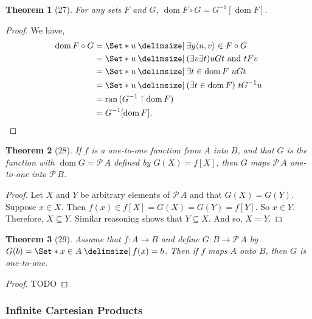 \documentclass[12pt]{article}
\theoremstyle{plain}
\newtheorem*{exthm}{Theorem}
\theoremstyle{remark}
\theoremstyle{definition}
\theoremstyle{remark}
\newcommand{\powerset}{\mathscr{P}\,}
\providecommand\st{}
\newcommand\SetSymbol[1][]{%
  \nonscript\:#1\vert%
  \allowbreak%
  \nonscript\:
\mathopen{}}
\DeclarePairedDelimiter{\ang}{\langle}{\rangle}
\renewcommand\st{\SetSymbol[\delimsize]}
\DeclareMathOperator{\dom}{dom}
\DeclareMathOperator{\ran}{ran}
\begin{document}
\begin{exthm}[27]
  For any sets $F$ and $G$, $\dom{F \circ G} = G^{-1}[\dom{F}]$.
\end{exthm}
\begin{proof}
  We have,
  \begin{align*}
    \dom{F \circ G} &= \Set*{u \st \exists y \ang{u, v} \in F \circ G}\\
                    &= \Set*{u \st (\exists v \exists t) uGt \text{ and } tFv}\\
                    &= \Set*{u \st \exists t \in \dom{F}\ uGt}\\
                    &= \Set*{u \st (\exists t \in \dom{F})\ tG^{-1}u}\\
                    &= \ran{(G^{-1} \restriction \dom F)}\\
                    &= G^{-1}[\dom{F}].
  \end{align*}
\end{proof}

\begin{exthm}[28]
  If $f$ is a one-to-one function from $A$ into $B$, and that $G$ is the function with $\dom{G} = \powerset{A}$ defined by $G(X) = f[X]$, then $G$ maps $\powerset{A}$ one-to-one into $\powerset{B}$.
\end{exthm}
\begin{proof}
  Let $X$ and $Y$ be arbitrary elements of $\powerset{A}$ and that $G(X) = G(Y)$. Suppose $x \in X$. Then $f(x) \in f[X] = G(X) = G(Y) = f[Y]$. So $x \in Y$. Therefore, $X \subseteq Y$. Similar reasoning shows that $Y \subseteq X$. And so, $X = Y$.
\end{proof}

\begin{exthm}[29]
  Assume that $f: A \rightarrow B$ and define $G: B \rightarrow \powerset{A}$ by $G(b) = \Set*{x \in A \st f(x) = b}$. Then if $f$ maps $A$ onto $B$, then $G$ is one-to-one.
\end{exthm}
\begin{proof}
  TODO
\end{proof}

\subsubsection{Infinite Cartesian Products}
\end{document}

